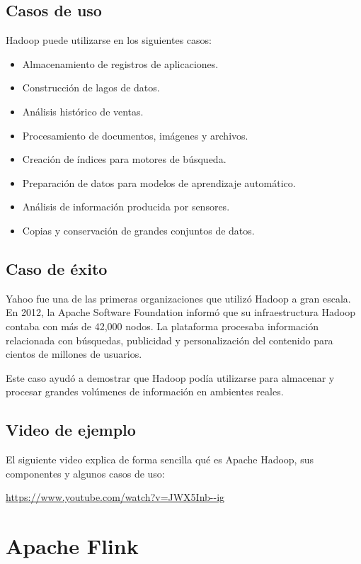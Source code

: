\subsection{Casos de uso}

Hadoop puede utilizarse en los siguientes casos:

\begin{itemize}
    \item Almacenamiento de registros de aplicaciones.
    \item Construcción de lagos de datos.
    \item Análisis histórico de ventas.
    \item Procesamiento de documentos, imágenes y archivos.
    \item Creación de índices para motores de búsqueda.
    \item Preparación de datos para modelos de aprendizaje automático.
    \item Análisis de información producida por sensores.
    \item Copias y conservación de grandes conjuntos de datos.
\end{itemize}

\subsection{Caso de éxito}

Yahoo fue una de las primeras organizaciones que utilizó Hadoop a gran escala.
En 2012, la Apache Software Foundation informó que su infraestructura Hadoop
contaba con más de 42,000 nodos. La plataforma procesaba información
relacionada con búsquedas, publicidad y personalización del contenido para
cientos de millones de usuarios.

Este caso ayudó a demostrar que Hadoop podía utilizarse para almacenar y
procesar grandes volúmenes de información en ambientes reales.

\subsection{Video de ejemplo}

El siguiente video explica de forma sencilla qué es Apache Hadoop, sus
componentes y algunos casos de uso:

\url{https://www.youtube.com/watch?v=JWX5Inb--ig}


\section{Apache Flink}

